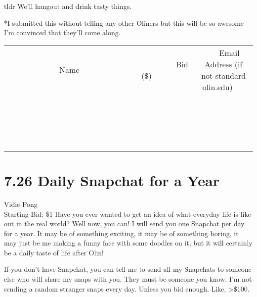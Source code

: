 \documentclass[11pt]{article}
\begin{document}
tldr
We'll hangout and drink tasty things.

*I submitted this without telling any other Oliners but this will be so awesome I'm convinced that they'll come along.
\\[3ex]
\begin{tabular}{c c c}
~~~~~~~~~~~~~Name~~~~~~~~~~~~~ & ~~~~~~~~~Bid (\$)~~~~~~~~~  & ~~~Email Address (if not standard olin.edu)~~~\\
 & & \\
\hline
 & & \\
\hline
 & & \\
\hline
 & & \\
\hline
 & & \\
\hline
 & & \\
\hline
 & & \\
\hline
 & & \\
\hline
 & & \\
\hline
 & & \\
\hline
 & & \\
\hline
 & & \\
\hline
 & & \\
\hline
 & & \\
\hline
 & & \\
\hline
 & & \\
\hline
 & & \\
\hline
 & & \\
\hline
 & & \\
\hline
\end{tabular}
\newpage
\section*{7.26 Daily Snapchat for a Year}
Vidie Pong
\\
Starting Bid: \$1
\newline
Have you ever wanted to get an idea of what everyday life is like out in the real world? Well now, you can! I will send you one Snapchat per day for a year. It may be of something exciting, it may be of something boring, it may just be me making a funny face with some doodles on it, but it will certainly be a daily taste of life after Olin!

If you don't have Snapchat, you can tell me to send all my Snapchats to someone else who will share my snaps with you. They must be someone you know. I'm not sending a random stranger snaps every day. Unless you bid enough. Like, >\$100.
\end{document}
